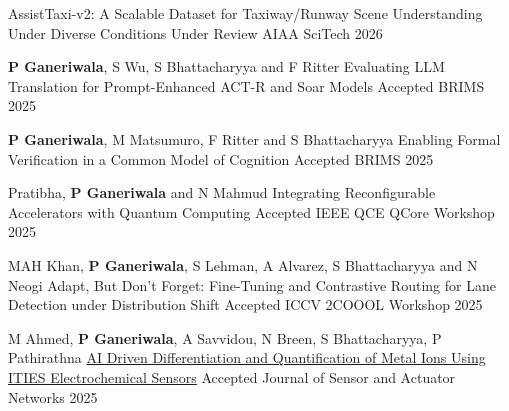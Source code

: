 \begin{cventries}
{AssistTaxi-v2: A Scalable Dataset for Taxiway/Runway Scene Understanding Under Diverse Conditions}
{Under Review}
{AIAA SciTech 2026} 
{ %
\begin{cvitems}
\end{cvitems}
}
\cventry
{\textbf{P Ganeriwala}, S Wu, S Bhattacharyya and F Ritter}
{
Evaluating LLM Translation for Prompt-Enhanced ACT-R and Soar Models}
{Accepted}
{BRIMS 2025} 
{ %
\begin{cvitems}
\end{cvitems}
}
\cventry
{\textbf{P Ganeriwala}, M Matsumuro, F Ritter and S Bhattacharyya}
{
Enabling Formal Verification in a Common Model of Cognition}
{Accepted}
{BRIMS 2025} 
{ %
\begin{cvitems}
\end{cvitems}
}
\cventry
{Pratibha, \textbf{P Ganeriwala} and N Mahmud}
{Integrating Reconfigurable Accelerators with Quantum Computing}
{Accepted}
{IEEE QCE QCore Workshop 2025} 
{ %
\begin{cvitems}
\end{cvitems}
}
\cventry
{MAH Khan, \textbf{P Ganeriwala}, S Lehman, A Alvarez, S Bhattacharyya and N Neogi}
{
Adapt, But Don’t Forget: Fine-Tuning and Contrastive Routing for Lane Detection under Distribution Shift}
{Accepted}
{ICCV 2COOOL Workshop 2025} 
{ %
\begin{cvitems}
\end{cvitems}
}
\cventry
{M Ahmed, \textbf{P Ganeriwala}, A Savvidou, N
Breen, S Bhattacharyya, P Pathirathna}
{
\href{https://www.mdpi.com/2224-2708/14/4/70}{AI Driven Differentiation and Quantification of Metal Ions Using ITIES Electrochemical Sensors}}
{Accepted}
{Journal of Sensor and Actuator Networks 2025} 

\end{cventries}
